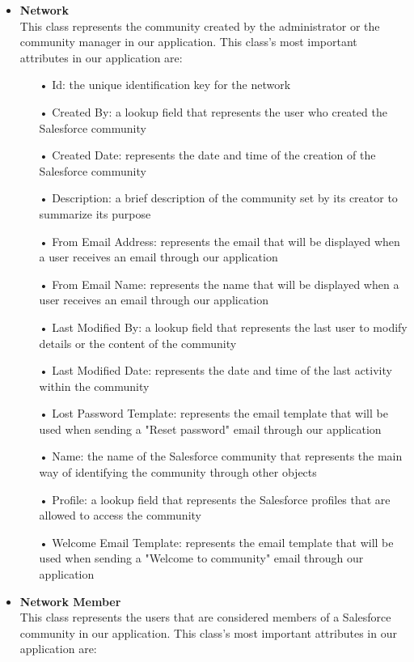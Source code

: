 \begin{itemize}
\begin{itemize}
\end{itemize}
\item \textbf{Network}\\
This class represents the community created by the administrator or the community manager in our application. This class's most important attributes in our application are:
\begin{itemize}
\item[•] Id: the unique identification key for the network 
\item[•] Created By: a lookup field that represents the user who created the Salesforce community 
\item[•] Created Date: represents the date and time of the creation of the Salesforce community
\item[•] Description: a brief description of the community set by its creator to summarize its purpose
\item[•] From Email Address: represents the email that will be displayed when a user receives an email through our application
\item[•] From Email Name: represents the name that will be displayed when a user receives an email through our application
\item[•] Last Modified By: a lookup field that represents the last user to modify details or the content of the community
\item[•] Last Modified Date: represents the date and time of the last activity within the community
\item[•] Lost Password Template: represents the email template that will be used when sending a "Reset password" email through our application
\item[•] Name: the name of the Salesforce community that represents the main way of identifying the community through other objects
\item[•] Profile: a lookup field that represents the Salesforce profiles that are allowed to access the community
\item[•] Welcome Email Template: represents the email template that will be used when sending a "Welcome to community" email through our application
\end{itemize}
\item \textbf{Network Member}\\
This class represents the users that are considered members of a Salesforce community in our application. This class's most important attributes in our application are:
\begin{itemize}

\end{itemize}
\end{itemize}
